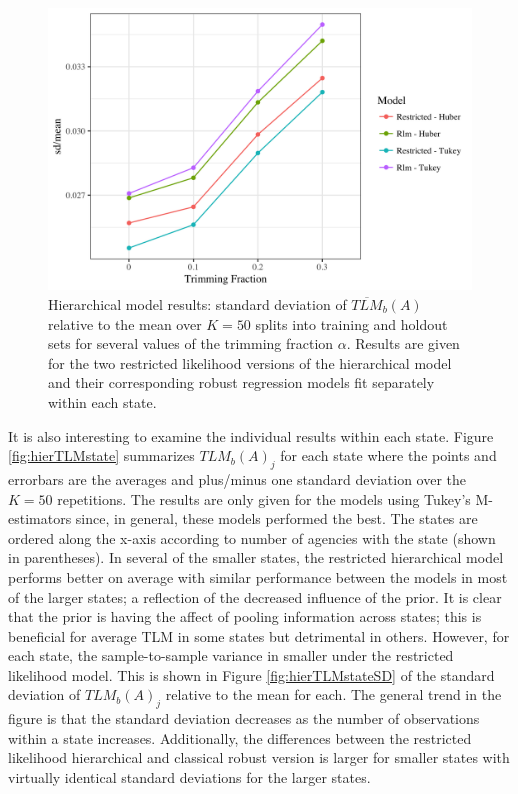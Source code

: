 \documentclass[ba]{imsart}
\begin{document}
\begin{figure}[t]
\centering
\includegraphics[width=6in]{hier_sd_tlm.png}
\caption{Hierarchical model results: standard deviation of $\overline{TLM}_b(A)$ relative to the mean over $K = 50$ splits into training and holdout sets for several values of the trimming fraction $\alpha$. Results are given for the two restricted likelihood versions of the hierarchical model and their corresponding robust regression models fit separately within each state.}
\label{fig:hierTLMsd}
\end{figure}

It is also interesting to examine the individual results within each state. Figure \ref{fig:hierTLMstate} summarizes ${TLM}_b(A)_{j}$ for each state where the points and errorbars are the averages and plus/minus one standard deviation over the $K = 50$ repetitions. The results are only given for the models using Tukey's M-estimators since, in general, these models performed the best.  The states are ordered along the x-axis according to number of agencies with the state (shown in parentheses). In several of the smaller states, the restricted hierarchical model performs better on average with similar performance between the models in most of the larger states; a reflection of the decreased influence of the prior. It is clear that the prior is having the affect of pooling information across states; this is beneficial for average TLM in some states but detrimental in others. However, for each state, the sample-to-sample variance in smaller under the restricted likelihood model. This is shown in Figure \ref{fig:hierTLMstateSD} of the standard deviation of ${TLM}_b(A)_{j}$ relative to the mean for each. The general trend in the figure is that the standard deviation decreases as the number of observations within a state increases. Additionally, the differences between the restricted likelihood hierarchical and classical robust version is larger for smaller states with virtually identical standard deviations for the larger states. 
\end{document}
